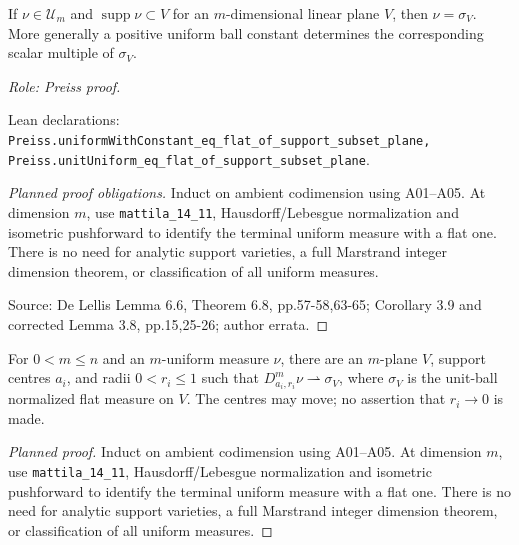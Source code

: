 \begin{lemma}
\label{lem:plane-supported-uniform-flat}






If $\nu\in\mathcal U_m$ and $\operatorname{supp}\nu\subset V$ for an $m$-dimensional linear plane $V$, then $\nu=\sigma_V$. More generally a positive uniform ball constant determines the corresponding scalar multiple of $\sigma_V$.
\par\emph{Role: Preiss proof.}
\par Lean declarations: \texttt{Preiss.uniformWithConstant\_eq\_flat\_of\_support\_subset\_plane, Preiss.unitUniform\_eq\_flat\_of\_support\_subset\_plane}.
\end{lemma}
\begin{proof}[Planned proof obligations]

Induct on ambient codimension using A01--A05. At dimension $m$, use
\texttt{mattila\_14\_11}, Hausdorff/Lebesgue normalization and isometric
pushforward to identify the terminal uniform measure with a flat one.
There is no need for analytic support varieties, a full Marstrand integer
dimension theorem, or classification of all uniform measures.
\par Source: De Lellis Lemma 6.6, Theorem 6.8, pp.57-58,63-65; Corollary 3.9 and corrected Lemma 3.8, pp.15,25-26; author errata.
\end{proof}

\begin{theorem}
\label{thm:flat-pseudotangent}


For $0<m\leq n$ and an $m$-uniform measure $\nu$, there are an $m$-plane $V$, support centres $a_i$, and radii $0<r_i\leq1$ such that $D^m_{a_i,r_i}\nu\rightharpoonup\sigma_V$, where $\sigma_V$ is the unit-ball normalized flat measure on $V$. The centres may move; no assertion that $r_i\to0$ is made.
\end{theorem}
\begin{proof}[Planned proof]
Induct on ambient codimension using A01--A05. At dimension $m$, use
\texttt{mattila\_14\_11}, Hausdorff/Lebesgue normalization and isometric
pushforward to identify the terminal uniform measure with a flat one.
There is no need for analytic support varieties, a full Marstrand integer
dimension theorem, or classification of all uniform measures.
\end{proof}

